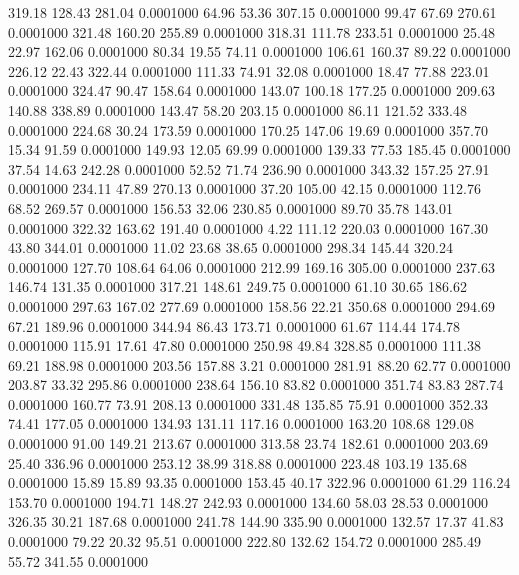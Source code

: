  319.18  128.43  281.04   0.0001000
  64.96   53.36  307.15   0.0001000
  99.47   67.69  270.61   0.0001000
 321.48  160.20  255.89   0.0001000
 318.31  111.78  233.51   0.0001000
  25.48   22.97  162.06   0.0001000
  80.34   19.55   74.11   0.0001000
 106.61  160.37   89.22   0.0001000
 226.12   22.43  322.44   0.0001000
 111.33   74.91   32.08   0.0001000
  18.47   77.88  223.01   0.0001000
 324.47   90.47  158.64   0.0001000
 143.07  100.18  177.25   0.0001000
 209.63  140.88  338.89   0.0001000
 143.47   58.20  203.15   0.0001000
  86.11  121.52  333.48   0.0001000
 224.68   30.24  173.59   0.0001000
 170.25  147.06   19.69   0.0001000
 357.70   15.34   91.59   0.0001000
 149.93   12.05   69.99   0.0001000
 139.33   77.53  185.45   0.0001000
  37.54   14.63  242.28   0.0001000
  52.52   71.74  236.90   0.0001000
 343.32  157.25   27.91   0.0001000
 234.11   47.89  270.13   0.0001000
  37.20  105.00   42.15   0.0001000
 112.76   68.52  269.57   0.0001000
 156.53   32.06  230.85   0.0001000
  89.70   35.78  143.01   0.0001000
 322.32  163.62  191.40   0.0001000
   4.22  111.12  220.03   0.0001000
 167.30   43.80  344.01   0.0001000
  11.02   23.68   38.65   0.0001000
 298.34  145.44  320.24   0.0001000
 127.70  108.64   64.06   0.0001000
 212.99  169.16  305.00   0.0001000
 237.63  146.74  131.35   0.0001000
 317.21  148.61  249.75   0.0001000
  61.10   30.65  186.62   0.0001000
 297.63  167.02  277.69   0.0001000
 158.56   22.21  350.68   0.0001000
 294.69   67.21  189.96   0.0001000
 344.94   86.43  173.71   0.0001000
  61.67  114.44  174.78   0.0001000
 115.91   17.61   47.80   0.0001000
 250.98   49.84  328.85   0.0001000
 111.38   69.21  188.98   0.0001000
 203.56  157.88    3.21   0.0001000
 281.91   88.20   62.77   0.0001000
 203.87   33.32  295.86   0.0001000
 238.64  156.10   83.82   0.0001000
 351.74   83.83  287.74   0.0001000
 160.77   73.91  208.13   0.0001000
 331.48  135.85   75.91   0.0001000
 352.33   74.41  177.05   0.0001000
 134.93  131.11  117.16   0.0001000
 163.20  108.68  129.08   0.0001000
  91.00  149.21  213.67   0.0001000
 313.58   23.74  182.61   0.0001000
 203.69   25.40  336.96   0.0001000
 253.12   38.99  318.88   0.0001000
 223.48  103.19  135.68   0.0001000
  15.89   15.89   93.35   0.0001000
 153.45   40.17  322.96   0.0001000
  61.29  116.24  153.70   0.0001000
 194.71  148.27  242.93   0.0001000
 134.60   58.03   28.53   0.0001000
 326.35   30.21  187.68   0.0001000
 241.78  144.90  335.90   0.0001000
 132.57   17.37   41.83   0.0001000
  79.22   20.32   95.51   0.0001000
 222.80  132.62  154.72   0.0001000
 285.49   55.72  341.55   0.0001000

